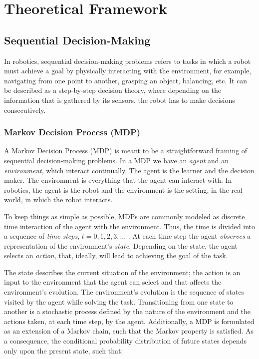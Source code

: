 \chapter{Theoretical Framework}
\section{Sequential Decision-Making}
In robotics, sequential decision-making problems refers to tasks in which a robot must achieve a goal by physically interacting with the environment, for example, navigating from one point to another, grasping an object, balancing, etc. It can be described as a step-by-step decision theory, where depending on the information that is gathered by its sensors, the robot has to make decisions consecutively.

\subsection{Markov Decision Process (MDP)}
A Markov Decision Process (MDP) is meant to be a straightforward framing of sequential decision-making problems. In a MDP we have an \emph{agent} and an \emph{environment}, which interact continually. The agent is the learner and the decision maker. The environment is everything that the agent can interact with\cite{sutton}. In robotics, the agent is the robot and the environment is the setting, in the real world, in which the robot interacts.

To keep things as simple as possible, MDPs are commonly modeled as discrete time interaction of the agent with the environment. Thus, the time is divided into a sequence of \emph{time steps}, $t=0,1,2,3,...$ . At each time step the agent \emph{observes} a representation of the environment's \emph{state}. Depending on the state, the agent selects an \emph{action}, that, ideally, will lead to achieving the goal of the task.

The state describes the current situation of the environment; the action is an input to the environment that the agent can select and that affects the environment's evolution. The environment's evolution is the sequence of states visited by the agent while solving the task. Transitioning from one state to another is a stochastic process defined by the nature of the environment and the actions taken, at each time step, by the agent. Additionally, a MDP is formulated as an extension of a Markov chain, such that the Markov property is satisfied. As a consequence, the conditional probability distribution of future states depends only upon the present state, such that:

